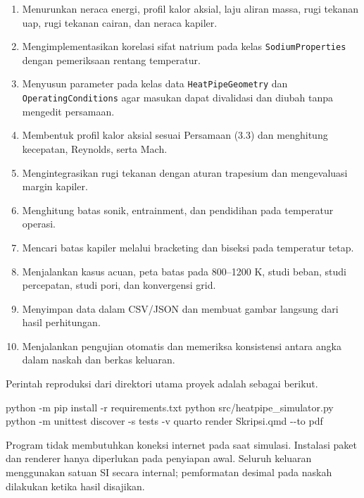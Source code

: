 \documentclass[
  12pt,a4paper,oneside]{report}
\newenvironment{Shaded}{\begin{snugshade}}{\end{snugshade}}
\newcommand{\AttributeTok}[1]{\textcolor[rgb]{0.77,0.63,0.00}{#1}}
\newcommand{\ExtensionTok}[1]{#1}
\newcommand{\NormalTok}[1]{#1}
\providecommand{\tightlist}{%
  \setlength{\itemsep}{0pt}\setlength{\parskip}{0pt}}
\begin{document}
\begin{enumerate}
\def\labelenumi{\arabic{enumi}.}
\tightlist
\item
  Menurunkan neraca energi, profil kalor aksial, laju aliran massa, rugi
  tekanan uap, rugi tekanan cairan, dan neraca kapiler.
\item
  Mengimplementasikan korelasi sifat natrium pada kelas
  \texttt{SodiumProperties} dengan pemeriksaan rentang temperatur.
\item
  Menyusun parameter pada kelas data \texttt{HeatPipeGeometry} dan
  \texttt{OperatingConditions} agar masukan dapat divalidasi dan diubah
  tanpa mengedit persamaan.
\item
  Membentuk profil kalor aksial sesuai Persamaan (3.3) dan menghitung
  kecepatan, Reynolds, serta Mach.
\item
  Mengintegrasikan rugi tekanan dengan aturan trapesium dan mengevaluasi
  margin kapiler.
\item
  Menghitung batas sonik, entrainment, dan pendidihan pada temperatur
  operasi.
\item
  Mencari batas kapiler melalui bracketing dan biseksi pada temperatur
  tetap.
\item
  Menjalankan kasus acuan, peta batas pada 800--1200 K, studi beban,
  studi percepatan, studi pori, dan konvergensi grid.
\item
  Menyimpan data dalam CSV/JSON dan membuat gambar langsung dari hasil
  perhitungan.
\item
  Menjalankan pengujian otomatis dan memeriksa konsistensi antara angka
  dalam naskah dan berkas keluaran.
\end{enumerate}

Perintah reproduksi dari direktori utama proyek adalah sebagai berikut.

\begin{Shaded}
\begin{Highlighting}[]
\ExtensionTok{python} \AttributeTok{{-}m}\NormalTok{ pip install }\AttributeTok{{-}r}\NormalTok{ requirements.txt}
\ExtensionTok{python}\NormalTok{ src/heatpipe\_simulator.py}
\ExtensionTok{python} \AttributeTok{{-}m}\NormalTok{ unittest discover }\AttributeTok{{-}s}\NormalTok{ tests }\AttributeTok{{-}v}
\ExtensionTok{quarto}\NormalTok{ render Skripsi.qmd }\AttributeTok{{-}{-}to}\NormalTok{ pdf}
\end{Highlighting}
\end{Shaded}

Program tidak membutuhkan koneksi internet pada saat simulasi. Instalasi
paket dan renderer hanya diperlukan pada penyiapan awal. Seluruh
keluaran menggunakan satuan SI secara internal; pemformatan desimal pada
naskah dilakukan ketika hasil disajikan.
\end{document}
